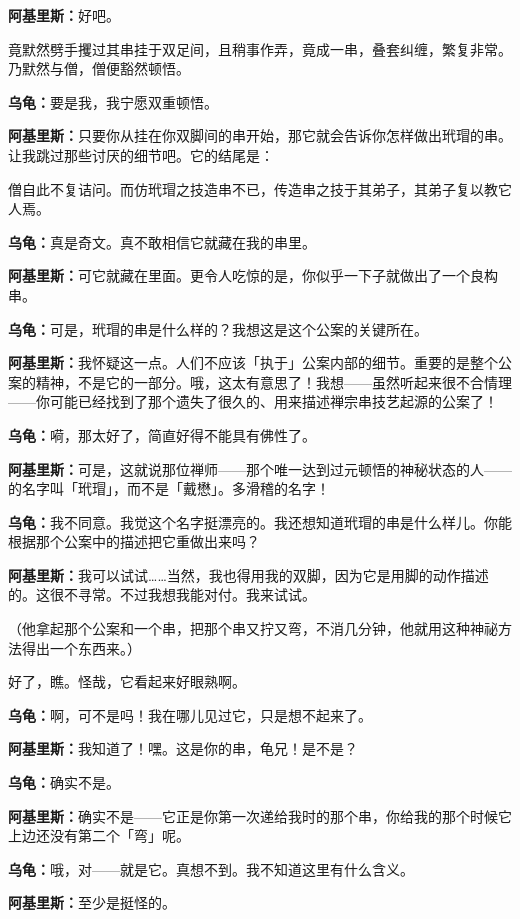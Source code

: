 \documentclass[
  12pt,
  twoside,
  openright,
  oldfontcommands,
]{memoir}
\newcommand{\dialogname}[1]{{\heifamily\bfseries #1}}
\begin{document}
\dialogname{阿基里斯：}好吧。

竟默然劈手攫过其串挂于双足间，且稍事作弄，竟成一串，叠套纠缠，繁复非常。乃默然与僧，僧便豁然顿悟。

\dialogname{乌龟：}要是我，我宁愿双重顿悟。

\dialogname{阿基里斯：}只要你从挂在你双脚间的串开始，那它就会告诉你怎样做出玳瑁的串。让我跳过那些讨厌的细节吧。它的结尾是：

僧自此不复诘问。而仿玳瑁之技造串不已，传造串之技于其弟子，其弟子复以教它人焉。

\dialogname{乌龟：}真是奇文。真不敢相信它就藏在我的串里。

\dialogname{阿基里斯：}可它就藏在里面。更令人吃惊的是，你似乎一下子就做出了一个良构串。

\dialogname{乌龟：}可是，玳瑁的串是什么样的？我想这是这个公案的关键所在。

\dialogname{阿基里斯：}我怀疑这一点。人们不应该「执于」公案内部的细节。重要的是整个公案的精神，不是它的一部分。哦，这太有意思了！我想------虽然听起来很不合情理------你可能已经找到了那个遗失了很久的、用来描述禅宗串技艺起源的公案了！

\dialogname{乌龟：}嗬，那太好了，简直好得不能具有佛性了。

\dialogname{阿基里斯：}可是，这就说那位禅师------那个唯一达到过元顿悟的神秘状态的人------的名字叫「玳瑁」，而不是「戴懋」。多滑稽的名字！

\dialogname{乌龟：}我不同意。我觉这个名字挺漂亮的。我还想知道玳瑁的串是什么样儿。你能根据那个公案中的描述把它重做出来吗？

\dialogname{阿基里斯：}我可以试试\ldots\ldots 当然，我也得用我的双脚，因为它是用脚的动作描述的。这很不寻常。不过我想我能对付。我来试试。

（他拿起那个公案和一个串，把那个串又拧又弯，不消几分钟，他就用这种神祕方法得出一个东西来。）

好了，瞧。怪哉，它看起来好眼熟啊。

\dialogname{乌龟：}啊，可不是吗！我在哪儿见过它，只是想不起来了。

\dialogname{阿基里斯：}我知道了！嘿。这是你的串，龟兄！是不是？

\dialogname{乌龟：}确实不是。

\dialogname{阿基里斯：}确实不是------它正是你第一次递给我时的那个串，你给我的那个时候它上边还没有第二个「弯」呢。

\dialogname{乌龟：}哦，对------就是它。真想不到。我不知道这里有什么含义。

\dialogname{阿基里斯：}至少是挺怪的。
\end{document}
